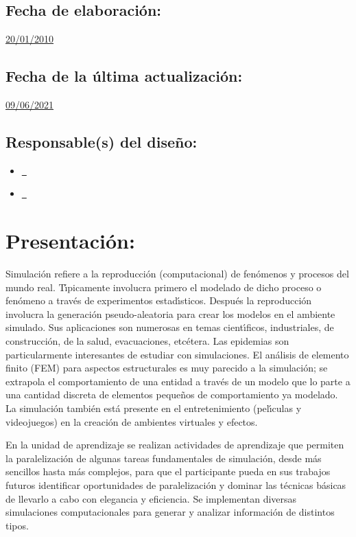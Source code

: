 \documentclass[10 pt]{article}
\begin{document}
\subsection{Fecha de elaboraci\'{o}n:} \underline{20/01/2010}
\subsection{Fecha de la \'{u}ltima actualizaci\'{o}n:} \underline{09/06/2021}
\subsection{Responsable(s) del dise\~{n}o:}
\begin{itemize}[label={}]
\item \underline{\nsara~\sara}
\item \underline{\nelisa~\elisa}
\end{itemize}
\newpage
\section{Presentaci\'{o}n:}

Simulaci\'{o}n refiere a la reproducci\'{o}n (computacional) de
fen\'{o}menos y procesos del mundo real. T\'{\i}picamente involucra
primero el modelado de dicho proceso o fen\'{o}meno a trav\'{e}s de
experimentos estad\'{\i}sticos. Despu\'{e}s la reproducci\'{o}n
involucra la generaci\'{o}n pseudo-aleatoria para crear los modelos en
el ambiente simulado. Sus aplicaciones son numerosas en temas
cient\'{\i}ficos, industriales, de construcci\'{o}n, de la salud,
evacuaciones, etc\'{e}tera. Las epidemias son particularmente
interesantes de estudiar con simulaciones. El an\'{a}lisis de elemento
finito (FEM) para aspectos estructurales es muy parecido a la
simulaci\'{o}n; se extrapola el comportamiento de una entidad a
trav\'{e}s de un modelo que lo parte a una cantidad discreta de
elementos peque\~{n}os de comportamiento ya modelado. La
simulaci\'{o}n tambi\'{e}n est\'{a} presente en el entretenimiento
(pel\'{\i}culas y videojuegos) en la creaci\'{o}n de ambientes
virtuales y efectos.

En la unidad de aprendizaje se realizan actividades de aprendizaje que
permiten la paralelizaci\'{o}n de algunas tareas fundamentales de
simulaci\'{o}n, desde m\'{a}s sencillos hasta m\'{a}s complejos, para
que el participante pueda en sus trabajos futuros identificar
oportunidades de paralelizaci\'{o}n y dominar las t\'{e}cnicas
b\'{a}sicas de llevarlo a cabo con elegancia y eficiencia. Se
implementan diversas simulaciones computacionales para generar y
analizar informaci\'{o}n de distintos tipos.
\end{document}
